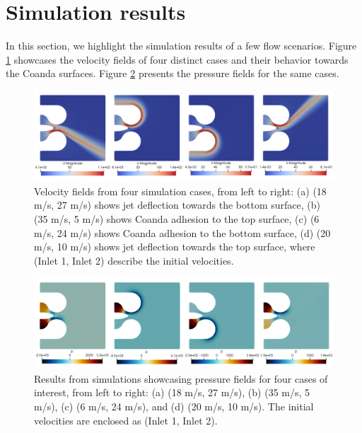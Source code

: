 \section{Simulation results}
In this section, we highlight the simulation results of a few flow scenarios. Figure \ref{vel} showcases the velocity fields of four distinct cases and their behavior towards the Coanda surfaces. Figure \ref{pres} presents the pressure fields for the same cases. 
\begin{figure}[ht]
  \centering
  \includegraphics[width=15.5cm]{images/Theory-CFD/cfdvel.png}
  \caption{Velocity fields from four simulation cases, from left to right: (a) (18 m/s, 27 m/s) shows jet deflection towards the bottom surface, (b) (35 m/s, 5 m/s) shows Coanda adhesion to the top surface, (c) (6 m/s, 24 m/s) shows Coanda adhesion to the bottom surface, (d) (20 m/s, 10 m/s) shows jet deflection towards the top surface, where (Inlet 1, Inlet 2) describe the initial velocities.}
  \label{vel}
\end{figure}
\begin{figure}[ht]
  \centering
  \includegraphics[width=15.5cm]{images/Theory-CFD/cfdp.png}
  \caption{Results from simulations showcasing pressure fields for four cases of interest, from left to right: (a) (18 m/s, 27 m/s), (b) (35 m/s, 5 m/s), (c) (6 m/s, 24 m/s), and (d) (20 m/s, 10 m/s). The initial velocities are enclosed as (Inlet 1, Inlet 2).}
  \label{pres}
\end{figure}